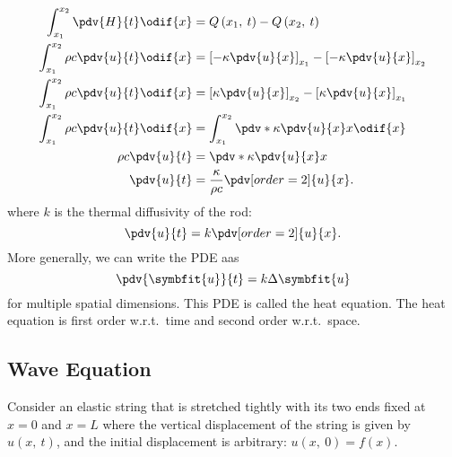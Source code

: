 \documentclass{article}
\begin{document}
\begin{align*}
    \int_{x_1}^{x_2} \pdv{H}{t} \odif{x}        & = Q\left( x_1,\: t \right) - Q\left( x_2,\: t \right)                               \\
    \int_{x_1}^{x_2} \rho c \pdv{u}{t} \odif{x} & = \left[ -\kappa \pdv{u}{x} \right]_{x_1} - \left[ -\kappa \pdv{u}{x} \right]_{x_2} \\
    \int_{x_1}^{x_2} \rho c \pdv{u}{t} \odif{x} & = \left[ \kappa \pdv{u}{x} \right]_{x_2} - \left[ \kappa \pdv{u}{x} \right]_{x_1}   \\
    \int_{x_1}^{x_2} \rho c \pdv{u}{t} \odif{x} & = \int_{x_1}^{x_2} \pdv*{\kappa \pdv{u}{x}}{x} \odif{x}                             \\
    \rho c \pdv{u}{t}                           & = \pdv*{\kappa \pdv{u}{x}}{x}                                                       \\
    \pdv{u}{t}                                  & = \frac{\kappa}{\rho c} \pdv[order=2]{u}{x}.
\end{align*}
where \(k\) is the thermal diffusivity of the rod:
\begin{equation*}
    \pdv{u}{t} = k\pdv[order=2]{u}{x}.
\end{equation*}
More generally, we can write the PDE aas
\begin{equation*}
    \pdv{\symbfit{u}}{t} = k \Delta{\symbfit{u}}
\end{equation*}
for multiple spatial dimensions. This PDE is called the heat equation.
The heat equation is first order w.r.t.\ time and second order w.r.t.\ space.
\subsection{Wave Equation}
Consider an elastic string that is stretched tightly with its two ends fixed at \(x = 0\) and \(x = L\) where
the vertical displacement of the string is given by \(u\left( x,\: t \right)\),
and the initial displacement is arbitrary: \(u\left( x,\: 0 \right) = f\left( x \right)\).
\end{document}
